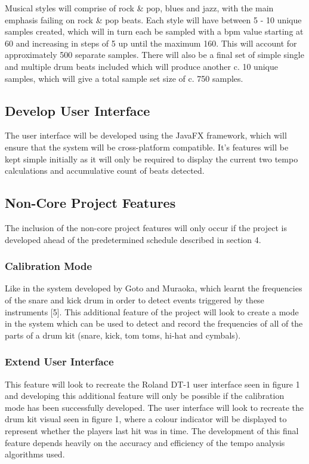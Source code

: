 \documentclass[a4paper, 11pt]{article}
\begin{document}
Musical styles will comprise of rock \& pop, blues and jazz, with the main emphasis failing on rock \& pop beats. Each style will have between 5 - 10 unique samples created, which will in turn each be sampled with a bpm value starting at 60 and increasing in steps of 5 up until the maximum 160. This will account for approximately 500 separate samples. There will also be a final set of simple single and multiple drum beats included which will produce another c. 10 unique samples, which will give a total sample set size of c. 750 samples.

\subsection{Develop User Interface}
The user interface will be developed using the JavaFX framework, which will ensure that the system will be cross-platform compatible. It's features will be kept simple initially as it will only be required to display the current two tempo calculations and accumulative count of beats detected.

\subsection{Non-Core Project Features}
The inclusion of the non-core project features will only occur if the project is developed ahead of the predetermined schedule described in section 4. 

\subsubsection{Calibration Mode}
Like in the system developed by Goto and Muraoka, which learnt the frequencies of the snare and kick drum in order to detect events triggered by these instruments [5]. This additional feature of the project will look to create a mode in the system which can be used to detect and record the frequencies of all of the parts of a drum kit (snare, kick, tom toms, hi-hat and cymbals).

\subsubsection{Extend User Interface}
This feature will look to recreate the Roland DT-1 user interface seen in figure 1 and developing this additional feature will only be possible if the calibration mode has been successfully developed. The user interface will look to recreate the drum kit visual seen in figure 1, where a colour indicator will be displayed to represent whether the players last hit was in time. The development of this final feature depends heavily on the accuracy and efficiency of the tempo analysis algorithms used.
\end{document}
